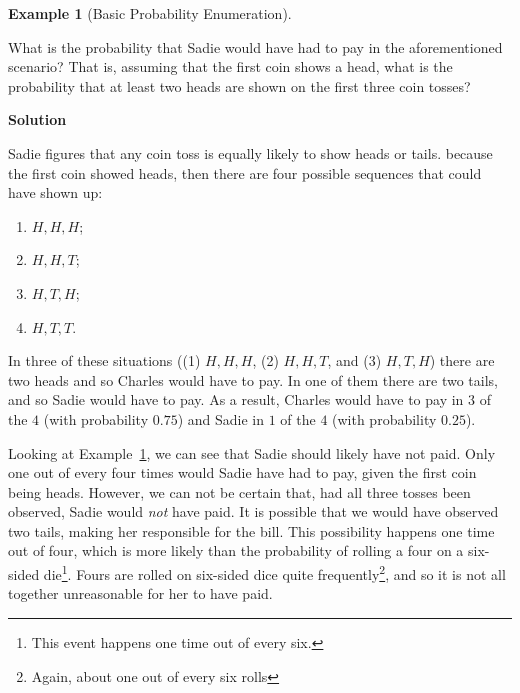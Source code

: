 \documentclass[
  letterpaper,
  DIV=11,
  numbers=noendperiod]{scrreprt}
\providecommand{\tightlist}{%
  \setlength{\itemsep}{0pt}\setlength{\parskip}{0pt}}\usepackage{longtable,booktabs,array}
\theoremstyle{definition}
\theoremstyle{definition}
\newtheorem{example}{Example}[chapter]
\theoremstyle{definition}
\theoremstyle{remark}
\begin{document}
\begin{example}[Basic Probability
Enumeration]\protect\hypertarget{exm-basic-prob}{}\label{exm-basic-prob}

What is the probability that Sadie would have had to pay in the
aforementioned scenario? That is, assuming that the first coin shows a
head, what is the probability that at least two heads are shown on the
first three coin tosses?

\begin{tcolorbox}[enhanced jigsaw, colback=white, colframe=quarto-callout-color-frame, arc=.35mm, leftrule=.75mm, rightrule=.15mm, opacityback=0, breakable, bottomrule=.15mm, left=2mm, toprule=.15mm]

\vspace{-3mm}\textbf{Solution}\vspace{3mm}

Sadie figures that any coin toss is equally likely to show heads or
tails. because the first coin showed heads, then there are four possible
sequences that could have shown up:

\begin{enumerate}
\def\labelenumi{\arabic{enumi}.}
\tightlist
\item
  \(H,H,H\);
\item
  \(H,H,T\);
\item
  \(H,T,H\);
\item
  \(H,T,T\).
\end{enumerate}

In three of these situations ((1) \(H,H,H\), (2) \(H,H,T\), and (3)
\(H,T,H\)) there are two heads and so Charles would have to pay. In one
of them there are two tails, and so Sadie would have to pay. As a
result, Charles would have to pay in \(3\) of the \(4\) (with
probability \(0.75\)) and Sadie in \(1\) of the \(4\) (with probability
\(0.25\)).

\end{tcolorbox}

\end{example}

Looking at Example~\ref{exm-basic-prob}, we can see that Sadie should
likely have not paid. Only one out of every four times would Sadie have
had to pay, given the first coin being heads. However, we can not be
certain that, had all three tosses been observed, Sadie would \emph{not}
have paid. It is possible that we would have observed two tails, making
her responsible for the bill. This possibility happens one time out of
four, which is more likely than the probability of rolling a four on a
six-sided die\footnote{This event happens one time out of every six.}.
Fours are rolled on six-sided dice quite frequently\footnote{Again,
  about one out of every six rolls}, and so it is not all together
unreasonable for her to have paid.
\end{document}
